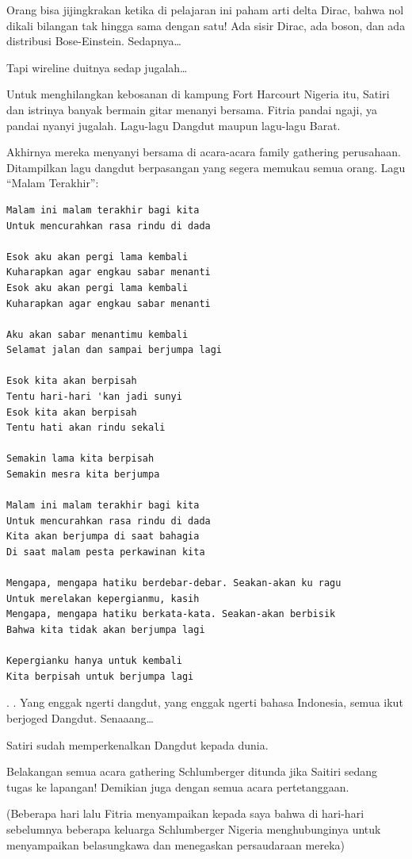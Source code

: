 Orang bisa jijingkrakan ketika di pelajaran ini paham arti delta Dirac, bahwa nol dikali bilangan tak hingga sama dengan satu! Ada sisir Dirac, ada boson, dan ada distribusi Bose-Einstein. Sedapnya…

Tapi wireline duitnya sedap jugalah…

Untuk menghilangkan kebosanan di kampung Fort Harcourt Nigeria itu, Satiri dan istrinya banyak bermain gitar menanyi bersama. Fitria pandai ngaji, ya pandai nyanyi jugalah. Lagu-lagu Dangdut maupun lagu-lagu Barat.

Akhirnya mereka menyanyi bersama di acara-acara family gathering perusahaan. Ditampilkan lagu dangdut berpasangan yang segera memukau semua orang. Lagu “Malam Terakhir”:

\begin{verbatim}
Malam ini malam terakhir bagi kita
Untuk mencurahkan rasa rindu di dada

Esok aku akan pergi lama kembali
Kuharapkan agar engkau sabar menanti
Esok aku akan pergi lama kembali
Kuharapkan agar engkau sabar menanti

Aku akan sabar menantimu kembali
Selamat jalan dan sampai berjumpa lagi

Esok kita akan berpisah
Tentu hari-hari 'kan jadi sunyi
Esok kita akan berpisah
Tentu hati akan rindu sekali

Semakin lama kita berpisah
Semakin mesra kita berjumpa

Malam ini malam terakhir bagi kita
Untuk mencurahkan rasa rindu di dada
Kita akan berjumpa di saat bahagia
Di saat malam pesta perkawinan kita

Mengapa, mengapa hatiku berdebar-debar. Seakan-akan ku ragu
Untuk merelakan kepergianmu, kasih
Mengapa, mengapa hatiku berkata-kata. Seakan-akan berbisik
Bahwa kita tidak akan berjumpa lagi

Kepergianku hanya untuk kembali
Kita berpisah untuk berjumpa lagi
\end{verbatim}
.
.
Yang enggak ngerti dangdut, yang enggak ngerti bahasa Indonesia, semua ikut berjoged Dangdut. Senaaang…

Satiri sudah memperkenalkan Dangdut kepada dunia.

Belakangan semua acara gathering Schlumberger ditunda jika Saitiri sedang tugas ke lapangan! Demikian juga dengan semua acara pertetanggaan.

(Beberapa hari lalu Fitria menyampaikan kepada saya bahwa di hari-hari sebelumnya beberapa keluarga Schlumberger Nigeria menghubunginya untuk menyampaikan belasungkawa dan menegaskan persaudaraan mereka)

